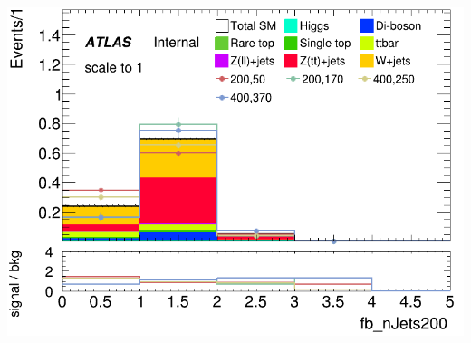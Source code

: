 \documentclass[usenames,dvipsnames]{beamer}
\begin{document}
\begin{frame}
\begin{minipage}{0.32\textwidth}
    \end{minipage}
    \hfill
    \begin{minipage}{0.32\textwidth}
        \centering
        \includegraphics[width=\textwidth]{graphics/HH_met_sig/HH_fb_nJets200_norm.png}
    \end{minipage}
     
    \vspace{0.5cm} %


\end{frame}
\end{document}
